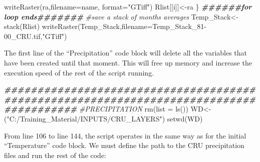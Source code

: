 \documentclass[
  10pt,
  b5paper,
]{book}
\newenvironment{Shaded}{\begin{snugshade}}{\end{snugshade}}
\newcommand{\AttributeTok}[1]{\textcolor[rgb]{0.77,0.63,0.00}{#1}}
\newcommand{\CommentTok}[1]{\textcolor[rgb]{0.56,0.35,0.01}{\textit{#1}}}
\newcommand{\DocumentationTok}[1]{\textcolor[rgb]{0.56,0.35,0.01}{\textbf{\textit{#1}}}}
\newcommand{\FunctionTok}[1]{\textcolor[rgb]{0.00,0.00,0.00}{#1}}
\newcommand{\NormalTok}[1]{#1}
\newcommand{\OtherTok}[1]{\textcolor[rgb]{0.56,0.35,0.01}{#1}}
\newcommand{\StringTok}[1]{\textcolor[rgb]{0.31,0.60,0.02}{#1}}
\begin{document}
\begin{Shaded}
\begin{Highlighting}[]
\FunctionTok{writeRaster}\NormalTok{(ra,}\AttributeTok{filename=}\NormalTok{name, }\AttributeTok{format=}\StringTok{"GTiff"}\NormalTok{)}
\NormalTok{Rlist[[i]]}\OtherTok{\textless{}{-}}\NormalTok{ra}
\NormalTok{\}}
\DocumentationTok{\#\#\#\#\#\#for loop ends\#\#\#\#\#\#\#}
 \CommentTok{\#save a stack of months averages}
\NormalTok{ Temp\_Stack}\OtherTok{\textless{}{-}}\FunctionTok{stack}\NormalTok{(Rlist)}
\FunctionTok{writeRaster}\NormalTok{(Temp\_Stack,}\AttributeTok{filename=}\StringTok{\textquotesingle{}Temp\_Stack\_81{-}00\_CRU.tif\textquotesingle{}}\NormalTok{,}\StringTok{"GTiff"}\NormalTok{)}
\end{Highlighting}
\end{Shaded}

The first line of the ``Precipitation'' code block will delete all the variables that have been created until that moment. This will free up memory and increase the execution speed of the rest of the script running.

\begin{Shaded}
\begin{Highlighting}[]
 \DocumentationTok{\#\#\#\#\#\#\#\#\#\#\#\#\#\#\#\#\#\#\#\#\#\#\#\#\#\#\#\#\#\#\#\#\#\#\#\#\#\#\#\#\#\#\#\#\#\#\#\#\#\#\#\#\#\#\#\#\#\#\#\#\#\#\#\#\#\#\#\#\#\#\#\#\#\#\#\#\#\#\#\#\#\#\#\#\#\#\#}
\CommentTok{\#PRECIPITATION}
 \FunctionTok{rm}\NormalTok{(}\AttributeTok{list =} \FunctionTok{ls}\NormalTok{())}
\NormalTok{WD}\OtherTok{\textless{}{-}}\NormalTok{(}\StringTok{"C:/Training\_Material/INPUTS/CRU\_LAYERS"}\NormalTok{)}
\FunctionTok{setwd}\NormalTok{(WD)}
\end{Highlighting}
\end{Shaded}

From line 106 to line 144, the script operates in the same way as for the initial ``Temperature'' code block. We must define the path to the CRU precipitation files and run the rest of the code:
\end{document}
